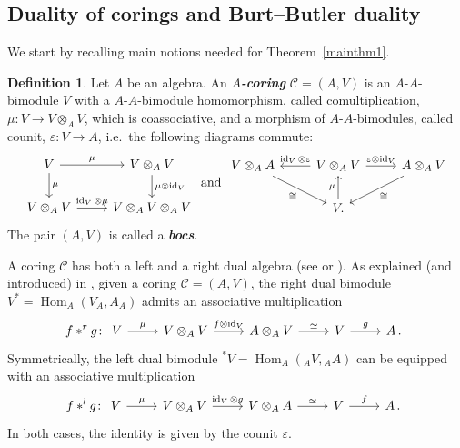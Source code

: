\documentclass[12pt,a4paper]{amsart}
\theoremstyle{plain}
\theoremstyle{definition}
\newtheorem{defn}[thm]{Definition}
\numberwithin{equation}{thm}
\newcommand{\emphbf}[1]{\emph{\textbf{#1}}}
\DeclareMathOperator{\id}{id}
\DeclareMathOperator{\Hom}{Hom}
\begin{document}
\subsection{Duality of corings and Burt--Butler duality}
We start by recalling main notions needed for Theorem~\ref{mainthm1}.
\begin{defn}
  Let $A$ be an algebra. An \emphbf{$A$-coring} $\mathcal{C} = (A,V)$
  is an $A$-$A$-bimodule $V$ with
  a $A$-$A$-bimodule homomorphism, called comultiplication,   
  $\mu \colon V\to V\otimes_A V$, which is coassociative, and a morphism of $A$-$A$-bimodules, called counit, 
  $\varepsilon\colon V\to A$, i.e.\ the following diagrams commute:
\[\begin{tikzcd}
V\arrow{r}{\mu}\arrow{d}{\mu} &V\otimes_A V\arrow{d}{\mu\otimes \id_V}\\
V\otimes_A V\arrow{r}{\id_V\otimes \mu} &V\otimes_AV\otimes_A V
\end{tikzcd} \text{ and } 
\begin{tikzcd}
  V\otimes_A A\arrow{dr}[swap]{\cong} &V\otimes_A V\arrow{l}[swap]{\id_V\otimes
    \varepsilon} \arrow{r}{\varepsilon\otimes \id_V} &
  A\otimes_A V\arrow{dl}{\cong}\\ &V.\arrow{u}{\mu}
\end{tikzcd}
\]
The pair $(A,V)$ is called a \emphbf{bocs}.
\end{defn}

A coring $\mathcal C$ has both a left and a right dual algebra
(see \cite{Swe75} or \cite[17.8]{BW03}). 
 As explained (and introduced) in \cite{Swe75}, given a coring $\mathcal{C}=(A,V)$, the right dual bimodule ${V}^{\ast}=
\Hom_{A}(V_A,A_A)$ admits an associative multiplication 
\begin{equation}\label{rd.mult}
    f \ast^r g\colon \begin{tikzcd}
    V \arrow{r}{\mu} & V \otimes_A V \arrow{r}{f \otimes \id_V} &
A \otimes_A V \arrow{r}{\simeq} & V \arrow{r}{g} & A\,.
\end{tikzcd}
\end{equation} 
Symmetrically, the left dual bimodule ${}^{\ast}{V} = \Hom_A({}_AV,{}_AA)$ can be equipped with an associative multiplication
\begin{equation}\label{ld.mult}
    f \ast^l g\colon \begin{tikzcd}
    V \arrow{r}{\mu} & V \otimes_A V \arrow{r}{\id_V \otimes g} &
V \otimes_A A \arrow{r}{\simeq} & V \arrow{r}{f} & A\,.
\end{tikzcd}
\end{equation}  
In both cases, the identity is given by the counit $\varepsilon$.
\end{document}
